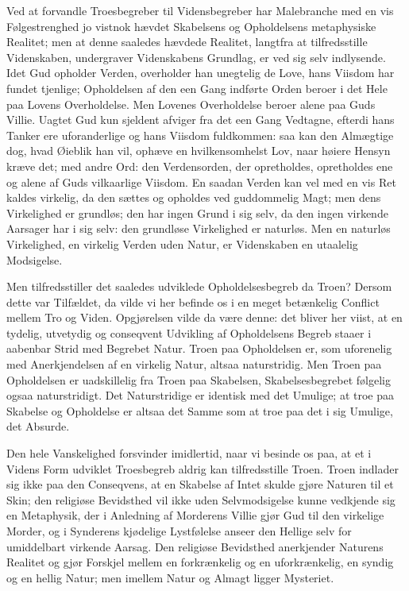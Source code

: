 \documentclass[12pt]{book}
\begin{document}
Ved at forvandle Troesbegreber til Vidensbegreber har Malebranche
med en vis Følgestrenghed jo vistnok hævdet Skabelsens og
Opholdelsens metaphysiske Realitet; men at denne saaledes hævdede
Realitet, langtfra at tilfredsstille Videnskaben, undergraver
Videnskabens Grundlag, er ved sig selv indlysende. Idet Gud
opholder Verden, overholder han unegtelig de Love, hans Viisdom har
fundet tjenlige; Opholdelsen af den een Gang indførte Orden beroer i
det Hele paa Lovens Overholdelse. Men Lovenes Overholdelse beroer
alene paa Guds Villie. Uagtet Gud kun sjeldent afviger fra det een
Gang Vedtagne, efterdi hans Tanker ere uforanderlige og hans Viisdom
fuldkommen: saa kan den Almægtige dog, hvad Øieblik han vil, ophæve
en hvilkensomhelst Lov, naar høiere Hensyn kræve det; med andre Ord:
den Verdensorden, der opretholdes, opretholdes ene og alene af Guds
vilkaarlige Viisdom. En saadan Verden kan vel med en vis Ret kaldes
virkelig, da den sættes og opholdes ved guddommelig Magt; men dens
Virkelighed er grundløs; den har ingen Grund i sig selv, da den
ingen virkende Aarsager har i sig selv: den grundløse Virkelighed er
naturløs. Men en naturløs Virkelighed, en virkelig Verden uden
Natur, er Videnskaben en utaalelig Modsigelse.

Men tilfredsstiller det saaledes udviklede Opholdelsesbegreb da
Troen? Dersom dette var Tilfældet, da vilde vi her befinde os i en
meget betænkelig Conflict mellem Tro og Viden. Opgjørelsen vilde da
være denne: det bliver her viist, at en tydelig, utvetydig og
conseqvent Udvikling af Opholdelsens Begreb staaer i aabenbar Strid
med Begrebet Natur. Troen paa Opholdelsen er, som uforenelig med
Anerkjendelsen af en virkelig Natur, altsaa naturstridig. Men Troen
paa Opholdelsen er uadskillelig fra Troen paa Skabelsen,
Skabelsesbegrebet følgelig ogsaa naturstridigt. Det Naturstridige er
identisk med det Umulige; at troe paa Skabelse og Opholdelse er
altsaa det Samme som at troe paa det i sig Umulige, det Absurde.

Den hele Vanskelighed forsvinder imidlertid, naar vi besinde os
paa, at et i Videns Form udviklet Troesbegreb aldrig kan
tilfredsstille Troen. Troen indlader sig ikke paa den Conseqvens, at
en Skabelse af Intet skulde gjøre Naturen til et Skin; den religiøse
Bevidsthed vil ikke uden Selvmodsigelse kunne vedkjende sig en
Metaphysik, der i Anledning af Morderens Villie gjør Gud til den
virkelige Morder, og i Synderens kjødelige Lystfølelse anseer den
Hellige selv for umiddelbart virkende Aarsag. Den religiøse
Bevidsthed anerkjender Naturens Realitet og gjør Forskjel mellem en
forkrænkelig og en uforkrænkelig, en syndig og en hellig Natur; men
imellem Natur og Almagt ligger Mysteriet.
\end{document}
